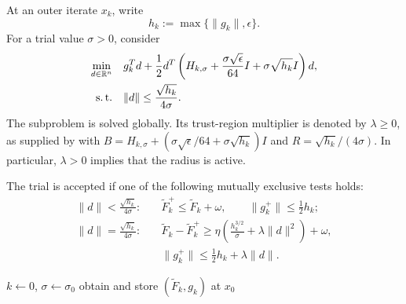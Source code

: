 \documentclass{article}
\begin{document}
At an outer iterate $x_k$, write
\begin{equation}\label{eq:clipped-scale}
 h_k:=\max\{\|g_k\|,\epsilon\}.
\end{equation}
For a trial value $\sigma>0$, consider
\begin{equation}\label{eq:adaptive-subproblem}
\begin{aligned}
    \min_{d\in\mathbb{R}^n}\quad
        &g_k^Td+\frac12d^T\left(
          H_{k,\sigma}+\frac{\sigma\sqrt\epsilon}{64}I
          +\sigma\sqrt{h_k}I\right)d,\\
    \operatorname{s.t.}\quad
        &\|d\|\le\frac{\sqrt{h_k}}{4\sigma}.
\end{aligned}
\end{equation}
The subproblem is solved globally.  Its trust-region multiplier is denoted
by $\lambda\ge0$, as supplied by
 with
$B=H_{k,\sigma}+(\sigma\sqrt\epsilon/64+\sigma\sqrt{h_k})I$ and
$R=\sqrt{h_k}/(4\sigma)$.  In particular, $\lambda>0$ implies that the
radius is active.

The trial is accepted if one of the following mutually exclusive tests
holds:
\begin{subequations}\label{eq:acceptance}
\begin{align}
    \|d\|<\frac{\sqrt{h_k}}{4\sigma}:\quad
    &\widetilde F_k^+\le \widetilde F_k+\omega,
    \qquad
    \|g_k^+\|\le\frac12h_k;
       \label{eq:acceptance-interior}\\
    \|d\|=\frac{\sqrt{h_k}}{4\sigma}:\quad
    &\widetilde F_k-\widetilde F_k^+
       \ge\eta\left(
           \frac{h_k^{3/2}}{\sigma}+\lambda\|d\|^2
       \right)+\omega, \label{eq:acceptance-boundary-function}\\
    &\|g_k^+\|\le\frac12h_k+\lambda\|d\|.
       \label{eq:acceptance-boundary-gradient}
\end{align}
\end{subequations}

\begin{algorithm}[H]
\DontPrintSemicolon
\caption{Certified-inexact adaptive clipped UTR}
\label{alg:adaptive-utr}
$k\leftarrow0$, $\sigma\leftarrow\sigma_0$\;
obtain and store $(\widetilde F_k,g_k)$ at $x_0$\;
\end{algorithm}
\end{document}
